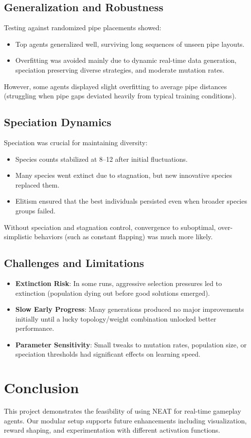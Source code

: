 \documentclass[sigconf]{acmart}
\begin{document}
\subsection{Generalization and Robustness}
Testing against randomized pipe placements showed:
\begin{itemize}
    \item Top agents generalized well, surviving long sequences of unseen pipe layouts.
    \item Overfitting was avoided mainly due to dynamic real-time data generation, speciation preserving diverse strategies, and moderate mutation rates.
\end{itemize}

However, some agents displayed slight overfitting to average pipe distances (struggling when pipe gaps deviated heavily from typical training conditions).

\subsection{Speciation Dynamics}
Speciation was crucial for maintaining diversity:
\begin{itemize}
    \item Species counts stabilized at 8--12 after initial fluctuations.
    \item Many species went extinct due to stagnation, but new innovative species replaced them.
    \item Elitism ensured that the best individuals persisted even when broader species groups failed.
\end{itemize}

Without speciation and stagnation control, convergence to suboptimal, over-simplistic behaviors (such as constant flapping) was much more likely.

\subsection{Challenges and Limitations}
\begin{itemize}
    \item \textbf{Extinction Risk}: In some runs, aggressive selection pressures led to extinction (population dying out before good solutions emerged).
    \item \textbf{Slow Early Progress}: Many generations produced no major improvements initially until a lucky topology/weight combination unlocked better performance.
    \item \textbf{Parameter Sensitivity}: Small tweaks to mutation rates, population size, or speciation thresholds had significant effects on learning speed.
\end{itemize}



\section{Conclusion}
This project demonstrates the feasibility of using NEAT for real-time gameplay agents. Our modular setup supports future enhancements including visualization, reward shaping, and experimentation with different activation functions.
\end{document}
